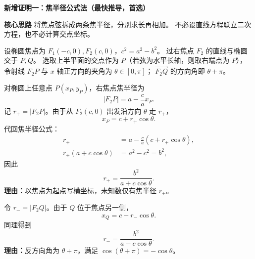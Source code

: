 \begin{proofbox}
    \textbf{\textcolor{CProof}{新增证明一：焦半径公式法（最快推导，首选）}}

    \textbf{\textcolor{CProof}{核心思路}}
    将焦点弦拆成两条焦半径，分别求长再相加。
    不必设直线方程联立二次方程，也不必计算交点坐标。

    \medskip

    设椭圆焦点为 $F_1(-c,0),F_2(c,0)$，$c^2=a^2-b^2$。
    过右焦点 $F_2$ 的直线与椭圆交于 $P,Q$。
    选取上半平面的交点作为 $P$（若弦为水平长轴，则取右端点为 $P$），
    令射线 $F_2P$ 与 $x$ 轴正方向的夹角为 $\theta\in[0,\pi]$；
    $\overrightarrow{F_2Q}$ 的方向角即 $\theta+\pi$。

    \begin{description}[style=nextline,leftmargin=2.8em,labelsep=0.5em,itemsep=0.55em]
        \item[\textbf{第一步（用右焦点焦半径公式）：}]
              对椭圆上任意点 $P(x_P,y_P)$，右焦点焦半径为
              \[
                  \boxed{|F_2P|=a-\frac ca x_P}.
              \]
              记 $r_+=|F_2P|$。由于从 $F_2(c,0)$ 出发沿方向 $\theta$ 走 $r_+$，
              \[
                  x_P=c+r_+\cos\theta.
              \]
              代回焦半径公式：
              \[
                  \begin{aligned}
                      r_+&=a-\frac ca(c+r_+\cos\theta),\\
                      r_+(a+c\cos\theta)&=a^2-c^2=b^2,
                  \end{aligned}
              \]
              因此
              \[
                  \boxed{r_+=\frac{b^2}{a+c\cos\theta}}.
              \]
              \textbf{理由：}以焦点为起点写横坐标，未知数仅有焦半径 $r_+$。

        \item[\textbf{第二步（方向相反，只换余弦符号）：}]
              令 $r_-=|F_2Q|$。由于 $Q$ 位于焦点另一侧，
              \[
                  x_Q=c-r_-\cos\theta.
              \]
              同理得到
              \[
                  \boxed{r_-=\frac{b^2}{a-c\cos\theta}}.
              \]
              \textbf{理由：}反方向角为 $\theta+\pi$，满足
              $\cos(\theta+\pi)=-\cos\theta$。


\end{description}
\end{proofbox}
